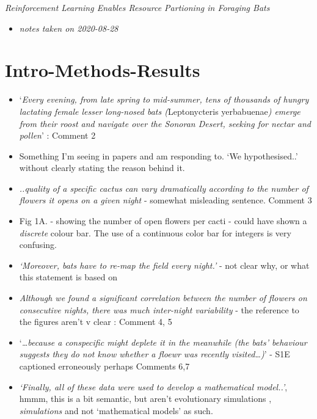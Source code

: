 \documentclass[
]{book}
\providecommand{\tightlist}{%
  \setlength{\itemsep}{0pt}\setlength{\parskip}{0pt}}
\begin{document}

\emph{Reinforcement Learning Enables Resource Partioning in Foraging Bats} \citep{goldshtein2020reinforcement}

\begin{itemize}
\tightlist
\item
  \emph{notes taken on 2020-08-28}
\end{itemize}

\hypertarget{intro-methods-results}{%
\section{Intro-Methods-Results}\label{intro-methods-results}}

\begin{itemize}
\item
  `\emph{Every evening, from late spring to mid-summer, tens of thousands of hungry lactating female lesser long-nosed bats (}Leptonycteris yerbabuenae\emph{) emerge from their roost and navigate over the Sonoran Desert, seeking for nectar and pollen}' : Comment 2
\item
  Something I'm seeing in papers and am responding to. `We hypothesised..' without clearly stating the reason behind it.
\item
  \emph{..quality of a specific cactus can vary dramatically according to the number of flowers it opens on a given night} - somewhat misleading sentence. Comment 3
\item
  Fig 1A. - showing the number of open flowers per cacti - could have shown a \emph{discrete} colour bar. The use of a continuous color bar for integers is very confusing.
\item
  \emph{`Moreover, bats have to re-map the field every night.'} - not clear why, or what this statement is based on
\item
  \emph{Although we found a significant correlation between the number of flowers on consecutive nights, there was much inter-night variability} - the reference to the figures aren't v clear : Comment 4, 5
\item
  `\emph{\ldots because a conspecific might deplete it in the meanwhile (the bats' behaviour suggests they do not know whether a floewr was recently visited\ldots)}' -
  S1E captioned erroneously perhaps Comments 6,7
\item
  \emph{`Finally, all of these data were used to develop a mathematical model..'}, hmmm, this is a bit semantic, but aren't evolutionary simulations , \emph{simulations} and not `mathematical models' as such.

\end{itemize}
\end{document}
